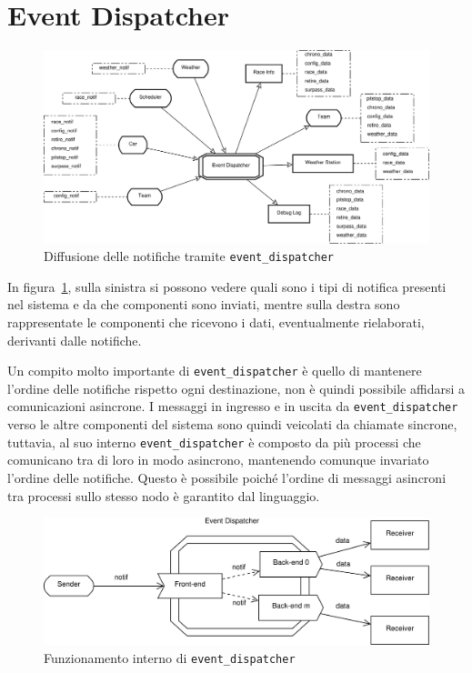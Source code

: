 \documentclass[11pt,a4paper]{report}
\begin{document}
\section{Event Dispatcher}
\label{sec:event_dispatcher}
\begin{landscape}
\begin{figure}
\includegraphics[width=0.75\paperheight]{diagrammi/NotifFlow}
\caption{Diffusione delle notifiche tramite \texttt{event\_dispatcher}}
\label{fig:notifFlow}
\end{figure}
\end{landscape}

In figura~\ref{fig:notifFlow}, sulla sinistra si possono vedere quali sono i tipi di notifica presenti nel sistema e da che componenti sono inviati, mentre sulla destra sono rappresentate le componenti che ricevono i dati, eventualmente rielaborati, derivanti dalle notifiche.

Un compito molto importante di \texttt{event\_dispatcher} è quello di mantenere l'ordine delle notifiche rispetto ogni destinazione, non è quindi possibile affidarsi a comunicazioni asincrone.
I messaggi in ingresso e in uscita da \texttt{event\_dispatcher} verso le altre componenti del sistema sono quindi veicolati da chiamate sincrone, tuttavia, al suo interno \texttt{event\_dispatcher} è composto da più processi che comunicano tra di loro in modo asincrono, mantenendo comunque invariato l'ordine delle notifiche.
Questo è possibile poiché l'ordine di messaggi asincroni tra processi sullo stesso nodo è garantito dal linguaggio.

\begin{figure}
\includegraphics[width=\textwidth]{diagrammi/Dispatcher}
\caption{Funzionamento interno di \texttt{event\_dispatcher}}
\label{fig:dispatcher}
\end{figure}
\end{document}
